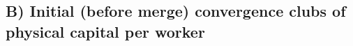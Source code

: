 \documentclass[11pt,a4paper,]{article}
\begin{document}
\newpage

\hypertarget{b-initial-before-merge-convergence-clubs-of-physical-capital-per-worker}{%
\subsection*{B) Initial (before merge) convergence clubs of physical capital per worker}\label{b-initial-before-merge-convergence-clubs-of-physical-capital-per-worker}}

\newpage

\printbibliography[title=References]
\end{document}
